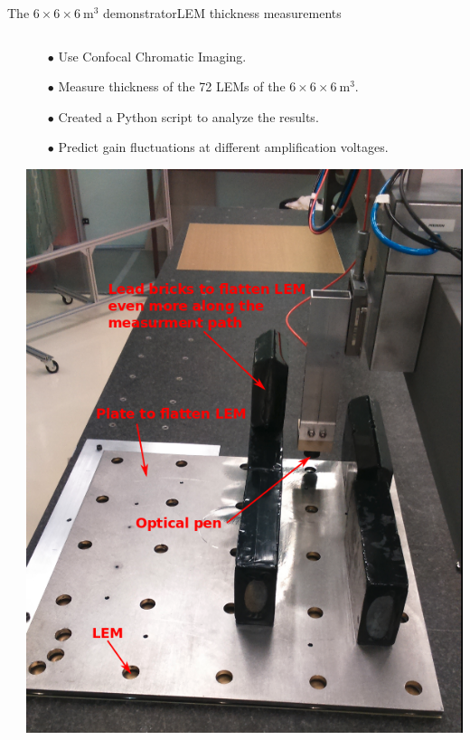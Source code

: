 \documentclass[10pt]{beamer}
\begin{document}
\begin{frame}{The \texorpdfstring{$6 \times 6 \times \SI{6}{\meter\cubed}$}{666} demonstrator}{LEM thickness measurements}
\begin{scriptsize}
\begin{columns}
\begin{column}{0.48\textwidth}
	    		\end{column}
	    		\hfill
	    		\begin{column}{0.48\textwidth}
	    			\begin{itemize}
	    				\item[$\bullet$] Use Confocal Chromatic Imaging.
	    				\item[$\bullet$] Measure thickness of the 72 LEMs of the $6 \times 6 \times \SI{6}{\meter\cubed}$.
	    				\item[$\bullet$] Created a Python script to analyze the results.
	    				\item[$\bullet$] Predict gain fluctuations at different amplification voltages.
	    			\end{itemize}
	    			\centering \includegraphics[height=0.5\textheight]{figures/666/plate_and_bricks.png}
	    		\end{column}
	   		\end{columns}
    	\end{scriptsize}
    \end{frame}
    
\end{document}
